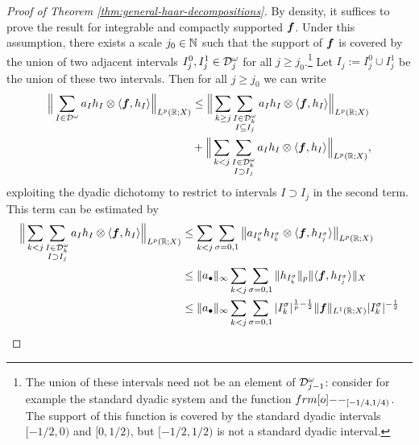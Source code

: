 \begin{proof}[Proof of Theorem \ref{thm:general-haar-decompositions}]
  By density, it suffices to prove the result for integrable and compactly supported $\bm{f}$.
  Under this assumption, there exists a scale $j_{0} \in \mathbb{N}$ such that the support of $\bm{f}$ is covered by the union of two adjacent intervals $I_{j}^{0}, I_{j}^{1} \in \mathcal{D}^{\omega}_{j}$ for all $j \geq j_{0}$.\footnote{The union of these intervals need not be an element of $\mathcal{D}^{\omega}_{j-1}$: consider for example the standard dyadic system and the function $\1_{[-1/4,1/4)}$.
    The support of this function is covered by the standard dyadic intervals $[-1/2,0)$ and $[0,1/2)$, but $[-1/2,1/2)$ is not a standard dyadic interval.}
  Let $I_{j} := I_{j}^{0} \cup I_{j}^{1}$ be the union of these two intervals.
  Then for all $j \geq j_{0}$ we can write
  \begin{equation*}
    \begin{aligned}
      \Big\| \sum_{I \in \mathcal{D}^{\omega}} a_{I} h_{I} \otimes \langle \bm{f}, h_{I} \rangle \Big\|_{L^p(\mathbb{R};X)}
      &\leq \Big\| \sum_{k \geq j} \sum_{\substack{I \in \mathcal{D}_{k}^{\omega} \\ I \subseteq I_{j}}} a_{I} h_{I} \otimes \langle \bm{f}, h_{I} \rangle \Big\|_{L^p(\mathbb{R};X)} \\
      &+ \Big\| \sum_{k < j} \sum_{\substack{I \in \mathcal{D}_{k}^{\omega} \\ I \supset I_{j}}} a_{I} h_{I} \otimes \langle \bm{f}, h_{I} \rangle \Big\|_{L^p(\mathbb{R};X)},
    \end{aligned}
  \end{equation*}
  exploiting the dyadic dichotomy to restrict to intervals $I \supset I_{j}$ in the second term.
  This term can be estimated by
  \begin{equation*}
    \begin{aligned}
      \Big\| \sum_{k < j} \sum_{\substack{I \in \mc{D}_{k}^{\omega} \\ I \supset I_{j}}} a_{I} h_{I} \otimes \langle \mb{f}, h_{I} \rangle \Big\|_{L^p(\R;X)}
      &\leq \sum_{k < j} \sum_{\sigma = 0,1} \big\| a_{I^{\sigma}_{k}} h_{I^{\sigma}_{k}} \otimes \langle \mb{f}, h_{I^{\sigma}_{j}} \rangle \big\|_{L^p(\R;X)} \\
      &\leq \|a_{\bullet}\|_{\infty} \sum_{k < j} \sum_{\sigma = 0,1} \|h_{I^{\sigma}_{k}}\|_{p} \| \langle \mb{f}, h_{I^{\sigma}_{j}} \rangle \|_{X} \\
      &\leq \|a_{\bullet}\|_{\infty} \sum_{k < j} \sum_{\sigma = 0,1} |I_{k}^\sigma|^{\frac{1}{p}-\frac{1}{2}} \|\mb{f}\|_{L^1(\R;X)} |I_{k}^{\sigma}|^{-\frac{1}{2}} \\

\end{aligned}
\end{equation*}
\end{proof}
